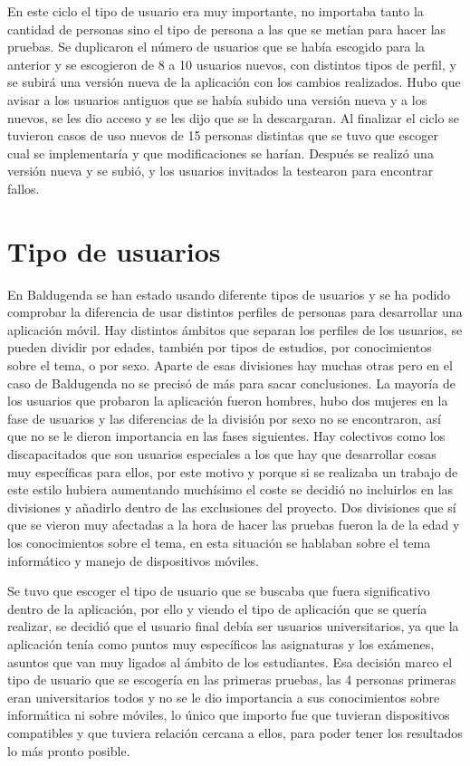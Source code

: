 En este ciclo el tipo de usuario era muy importante, no importaba tanto la cantidad de personas sino el tipo de persona a las que se metían  para hacer las pruebas.
Se duplicaron el número de usuarios que se había escogido para la anterior y se escogieron de 8 a 10 usuarios nuevos, con distintos tipos de perfil, y se subirá una versión nueva de la aplicación con los cambios realizados.
Hubo que avisar a los usuarios antiguos que se había subido una versión nueva y a los nuevos, se les dio acceso y se les dijo que se la descargaran.
Al finalizar el ciclo se tuvieron casos de uso nuevos de 15 personas distintas que se tuvo que escoger cual se implementaría  y que modificaciones se harían.
Después se realizó una versión nueva y se subió, y los usuarios invitados la testearon para encontrar fallos.



\section{Tipo de usuarios}
\label{secc:tipo de usuarios}

En Baldugenda se han estado usando diferente tipos de usuarios y se ha podido comprobar la diferencia de usar distintos perfiles de personas para desarrollar una aplicación móvil.
Hay distintos ámbitos que separan los perfiles de los usuarios, se pueden dividir por edades, también por tipos de estudios, por conocimientos sobre el tema, o por sexo.
Aparte de esas divisiones hay muchas otras pero en el caso de Baldugenda no se precisó de más para sacar conclusiones.
La mayoría de los usuarios que probaron la aplicación fueron hombres, hubo dos mujeres en la fase de usuarios y las diferencias de la división por sexo no se encontraron, así que no se le dieron importancia en las fases siguientes.
Hay colectivos como los discapacitados que son usuarios especiales a los que hay que desarrollar cosas muy específicas para ellos, por este motivo y porque si se realizaba un trabajo de este estilo hubiera aumentando muchísimo el coste se decidió no incluirlos en las divisiones y añadirlo dentro de las exclusiones del proyecto.
Dos divisiones que sí que se vieron muy afectadas a la hora de hacer las pruebas fueron la de la edad y los conocimientos sobre el tema, en esta situación se hablaban sobre el tema informático y manejo de dispositivos móviles.

Se tuvo que escoger el tipo de usuario que se buscaba que fuera significativo dentro de la aplicación, por ello y viendo el tipo de aplicación que se quería realizar, se decidió que el usuario final debía ser usuarios universitarios, ya que la aplicación tenía como puntos muy específicos las asignaturas y los exámenes, asuntos que van muy ligados al ámbito de los estudiantes.
Esa decisión marco el tipo de usuario que se escogería en las primeras pruebas, las 4 personas primeras eran universitarios todos y no se le dio importancia a sus conocimientos sobre informática ni sobre móviles, lo único que importo fue que tuvieran dispositivos compatibles y que tuviera relación cercana a ellos, para poder tener los resultados lo más pronto posible.

